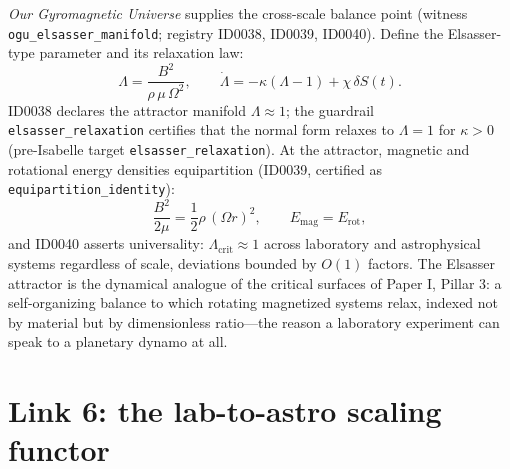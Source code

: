 \documentclass[11pt]{article}
\theoremstyle{remark}
\begin{document}
\emph{Our Gyromagnetic Universe} supplies the cross-scale balance point (witness \texttt{ogu\_elsasser\_manifold}; registry ID0038, ID0039, ID0040). Define the Elsasser-type parameter and its relaxation law:
\begin{equation}
\Lambda = \frac{B^2}{\rho\, \mu\, \Omega^2}, \qquad
\dot{\Lambda} = -\kappa(\Lambda - 1) + \chi\, \delta S(t).
\label{eq:elsasser}
\end{equation}
ID0038 declares the attractor manifold $\Lambda \approx 1$; the guardrail \texttt{elsasser\_relaxation} certifies that the normal form relaxes to $\Lambda = 1$ for $\kappa > 0$ (pre-Isabelle target \texttt{elsasser\_relaxation}). At the attractor, magnetic and rotational energy densities equipartition (ID0039, certified as \texttt{equipartition\_identity}):
\begin{equation}
\frac{B^2}{2\mu} = \frac{1}{2}\rho\, (\Omega r)^2, \qquad E_{\mathrm{mag}} = E_{\mathrm{rot}},
\label{eq:equipartition}
\end{equation}
and ID0040 asserts universality: $\Lambda_{\mathrm{crit}} \approx 1$ across laboratory and astrophysical systems regardless of scale, deviations bounded by $O(1)$ factors. The Elsasser attractor is the dynamical analogue of the critical surfaces of Paper I, Pillar 3: a self-organizing balance to which rotating magnetized systems relax, indexed not by material but by dimensionless ratio---the reason a laboratory experiment can speak to a planetary dynamo at all.

\section{Link 6: the lab-to-astro scaling functor}
\label{sec:scaling}
\end{document}
